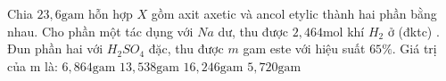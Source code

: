 \begin{ex}
	Chia $ 23,6\mathrm{gam} $ hỗn hợp $ X $ gồm axit axetic và ancol etylic thành hai phần bằng nhau. Cho phần một tác dụng với $ Na $ dư, thu được $ 2,464\mathrm{mol} $
	khí $ H_2 $ ở (đktc) . Đun phần hai với $ H_2SO_4 $ đặc, thu được $ m $ gam este với hiệu suất $ 65\% $. Giá trị của m là:
	\choice
	{%
		$ 6,864 \mathrm{gam}$
	}
	{%
		$ 13,538 \mathrm{gam}$
	}
	{%
		$ 16,246 \mathrm{gam}$
	}
	{%
		\True $ 5,720 \mathrm{gam}$
	}
	\sodongkeex[6]
	\loigiai
	{%
		
	}
\end{ex}



